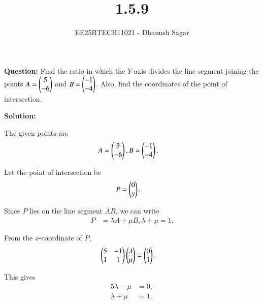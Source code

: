 \documentclass[journal]{IEEEtran}
\begin{document}



\title{1.5.9}
\author{EE25BTECH11021 - Dhanush Sagar
}
{\let\newpage\relax\maketitle}

\renewcommand{\thefigure}{\theenumi}
\renewcommand{\thetable}{\theenumi}
\setlength{\intextsep}{10pt} %


\renewcommand{\thetable}{\theenumi}




\textbf{Question:}  
Find the ratio in which the $Y$-axis divides the line segment joining the points  
$A = \begin{pmatrix}5 \\ -6\end{pmatrix}$ and $B = \begin{pmatrix}-1 \\ -4\end{pmatrix}$.  
Also, find the coordinates of the point of intersection.  

\textbf{Solution:}  

The given points are
\begin{align}
A &= \begin{pmatrix}5 \\ -6\end{pmatrix},  
B = \begin{pmatrix}-1 \\ -4\end{pmatrix}.
\end{align}

Let the point of intersection be
\begin{align}
P &= \begin{pmatrix}0 \\ y\end{pmatrix}.
\end{align}

Since $P$ lies on the line segment $AB$, we can write
\begin{align}
P &= \lambda A + \mu B,  \lambda + \mu = 1.
\end{align}

From the $x$-coordinate of $P$,
\begin{align}
\begin{pmatrix}5 & -1 \\ 1 & 1\end{pmatrix}\begin{pmatrix}\lambda \\ \mu\end{pmatrix} &= \begin{pmatrix}0 \\ 1\end{pmatrix}.
\end{align}

This gives
\begin{align}
5\lambda - \mu &= 0, \\
\lambda + \mu &= 1.
\end{align}
\end{document}
